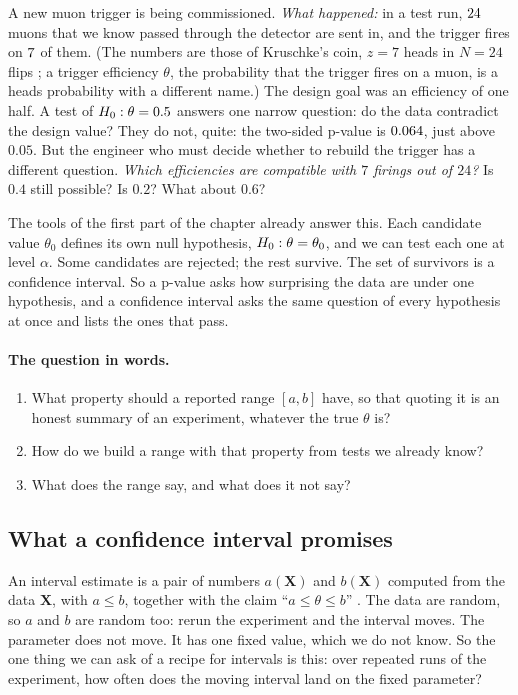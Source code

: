 A new muon trigger is being commissioned. \emph{What happened:} in a test run,
$24$ muons that we know passed through the detector are sent in, and the
trigger fires on $7$ of them. (The numbers are those of Kruschke's coin,
$z=7$ heads in $N=24$ flips ; a trigger efficiency
$\theta$, the probability that the trigger fires on a muon, is a heads
probability with a different name.) The design goal was an efficiency of one
half. A test of $H_0:\theta=0.5$ answers one narrow question: do the data
contradict the design value? They do not, quite: the two-sided p-value is
$0.064$, just above $0.05$. But the engineer who must decide whether
to rebuild the trigger has a different question. \emph{Which efficiencies are
compatible with $7$ firings out of $24$?} Is $0.4$ still possible? Is $0.2$?
What about $0.6$?

The tools of the first part of the chapter already answer this. Each candidate
value $\theta_0$ defines its own null hypothesis, $H_0:\theta=\theta_0$, and
we can test each one at level $\alpha$. Some candidates are rejected; the rest
survive. The set of survivors is a confidence interval. So a p-value asks how
surprising the data are under one hypothesis, and a confidence interval asks
the same question of every hypothesis at once and lists the ones that pass.

\paragraph{The question in words.}
\begin{enumerate}[label=\arabic*.]
  \item What property should a reported range $[a,b]$ have, so that quoting it
        is an honest summary of an experiment, whatever the true $\theta$ is?
  \item How do we build a range with that property from tests we already know?
  \item What does the range say, and what does it not say?
\end{enumerate}

\subsection{What a confidence interval promises}
\label{4b:sec:ci-def}

An interval estimate is a pair of numbers $a(\bm X)$ and $b(\bm X)$ computed
from the data $\bm X$, with $a\le b$, together with the claim
``$a\le\theta\le b$'' . The data are random,
so $a$ and $b$ are random too: rerun the experiment and the interval moves. The
parameter does not move. It has one fixed value, which we do not know. So the
one thing we can ask of a recipe for intervals is this: over repeated runs of
the experiment, how often does the moving interval land on the fixed
parameter?

